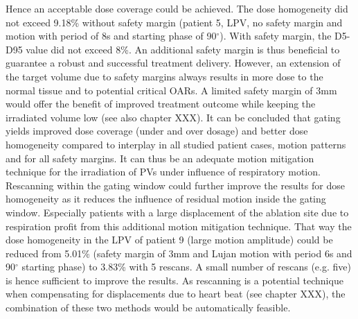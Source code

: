 \documentclass[type=dr, dr=rernat, accentcolor=tud7b,colorbacktitle, bigchapter, openright, twoside, 12pt ]{tudthesis}
\begin{document}
Hence an acceptable dose coverage could be achieved. The dose homogeneity did not exceed 9.18\% without safety margin (patient 5, LPV, no safety margin and motion 
with period of 8s and starting phase of 90$^{\circ}$). With safety margin, the D5-D95 value did not exceed 8\%. An additional safety margin 
is thus beneficial to guarantee a robust and successful treatment delivery. However, an extension of the target volume due to safety margins 
always results in more dose to the normal tissue and to potential critical OARs. A limited safety margin of 3mm would offer the benefit of 
improved treatment outcome while keeping the irradiated volume low (see also chapter XXX).\newline
\newline
\newpage
It can be concluded that gating yields improved dose coverage (under and over dosage) and better dose homogeneity compared to interplay in 
all studied patient cases, motion patterns and for all safety margins. It can thus be an adequate motion mitigation technique for the 
irradiation of PVs under influence of respiratory motion.\newline 
\newline
Rescanning within the gating window could further improve the results for dose homogeneity as it reduces the influence of residual motion 
inside the gating window. Especially patients with a large displacement of the ablation site due to respiration profit from this additional 
motion mitigation technique. That way the dose homogeneity in the LPV of patient 9 (large motion amplitude) could be reduced from 5.01\%  
(safety margin of 3mm and Lujan motion with period 6s and 90$^{\circ}$ starting phase) to 3.83\% with 5 rescans. 
A small number of rescans (e.g. five) is hence sufficient to improve the results. 
As rescanning is a potential technique when compensating for displacements due to heart beat (see chapter XXX), the combination of these 
two methods would be automatically feasible. 




%   
% 
% 
\end{document}
